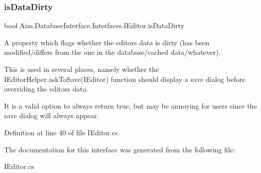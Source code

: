 \subsubsection{\texorpdfstring{is\+Data\+Dirty}{isDataDirty}}
{\footnotesize\ttfamily bool Aim.\+Database\+Interface.\+Interfaces.\+I\+Editor.\+is\+Data\+Dirty\hspace{0.3cm}{\ttfamily [get]}}



A property which flags whether the editor\textquotesingle{}s data is dirty (has been modified/differs from the one in the database/cached data/whatever). 

This is used in several places, namely whether the I\+Editor\+Helper.\+ask\+To\+Save(\+I\+Editor) function should display a save dialog before overriding the editor\textquotesingle{}s data.

It is a valid option to always return true, but may be annoying for users since the save dialog will always appear. 

Definition at line 40 of file I\+Editor.\+cs.



The documentation for this interface was generated from the following file\+:\begin{DoxyCompactItemize}
\item 
I\+Editor.\+cs\end{DoxyCompactItemize}
